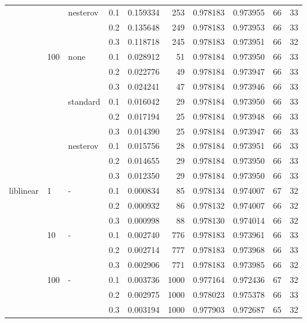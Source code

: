 \begin{table}[H]
\begin{tabular}{llllrrrrrr}
          &     & nesterov & 0.1 &  0.159334 &     253 &  0.978183 &  0.973955 &          66 &        33 \\
          &     &   & 0.2 &  0.135648 &     249 &  0.978183 &  0.973953 &          66 &        33 \\
          &     &   & 0.3 &  0.118718 &     245 &  0.978183 &  0.973951 &          66 &        32 \\
          & 100 & none & 0.1 &  0.028912 &      51 &  0.978184 &  0.973950 &          66 &        33 \\
          &     &   & 0.2 &  0.022776 &      49 &  0.978184 &  0.973947 &          66 &        33 \\
          &     &   & 0.3 &  0.024241 &      47 &  0.978184 &  0.973946 &          66 &        33 \\
          &     & standard & 0.1 &  0.016042 &      29 &  0.978184 &  0.973950 &          66 &        33 \\
          &     &   & 0.2 &  0.017194 &      25 &  0.978184 &  0.973948 &          66 &        33 \\
          &     &   & 0.3 &  0.014390 &      25 &  0.978184 &  0.973947 &          66 &        33 \\
          &     & nesterov & 0.1 &  0.015756 &      28 &  0.978184 &  0.973951 &          66 &        33 \\
          &     &   & 0.2 &  0.014655 &      29 &  0.978184 &  0.973950 &          66 &        33 \\
          &     &   & 0.3 &  0.012350 &      29 &  0.978184 &  0.973950 &          66 &        33 \\
liblinear & 1   & - & 0.1 &  0.000834 &      85 &  0.978134 &  0.974007 &          67 &        32 \\
          &     &   & 0.2 &  0.000932 &      86 &  0.978132 &  0.974007 &          66 &        32 \\
          &     &   & 0.3 &  0.000998 &      88 &  0.978130 &  0.974014 &          66 &        32 \\
          & 10  & - & 0.1 &  0.002740 &     776 &  0.978183 &  0.973961 &          66 &        33 \\
          &     &   & 0.2 &  0.002714 &     777 &  0.978183 &  0.973968 &          66 &        33 \\
          &     &   & 0.3 &  0.002906 &     771 &  0.978183 &  0.973985 &          66 &        32 \\
          & 100 & - & 0.1 &  0.003736 &    1000 &  0.977164 &  0.972436 &          67 &        32 \\
          &     &   & 0.2 &  0.002975 &    1000 &  0.978023 &  0.975378 &          66 &        33 \\
          &     &   & 0.3 &  0.003194 &    1000 &  0.977903 &  0.972687 &          65 &        32 \\
\bottomrule
\end{tabular}
\end{table}
